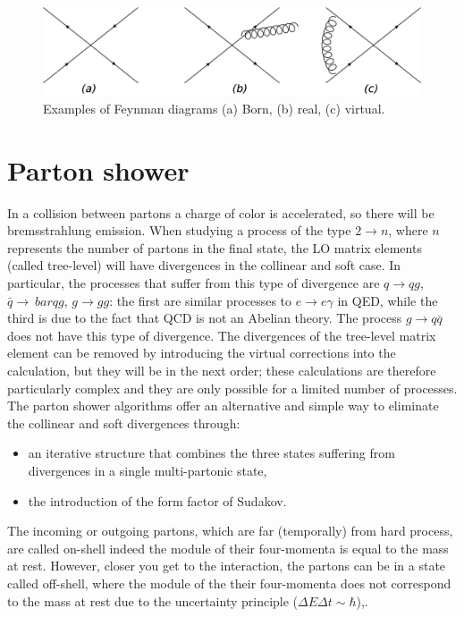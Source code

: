\begin{figure}
\centering
\includegraphics[scale=0.22]{../Cap3/Fig_MC/nlo2}
\caption{ Examples of Feynman diagrams (a)  Born, (b) real, (c) virtual. }
\label{nlofig}
\end{figure}

 
\section{Parton shower}
\label{ps}
In a collision between partons a charge of color is accelerated, so there will be bremsstrahlung emission. When studying a process of the type $ 2 \rightarrow n $, where $ n $ represents the number of partons in the final state, the LO matrix elements (called tree-level) will have divergences in the collinear  and 
soft case. In particular, the processes that suffer from this type of divergence are $ q \rightarrow qg $, $ \bar {q} \rightarrow \ bar{q} g $, $ g \rightarrow gg $: the first are similar processes to $ e \rightarrow e \gamma $ in QED, while the third is due to the fact that QCD is not an Abelian theory. The process $ g \rightarrow q \bar {q} $ does not have this type of divergence.
The divergences of the tree-level matrix element can be removed by introducing the virtual corrections into the calculation, but they will be in the next order; these calculations are therefore particularly complex and they are only possible for a limited number of processes. The parton shower \cite{Sjostrand: 2006su} algorithms offer an alternative and simple way to eliminate the collinear and soft divergences through:
\begin{itemize}
\item an iterative structure that combines the three states suffering from divergences in a single multi-partonic state,
\item the introduction of the form factor of Sudakov.
\end{itemize}
The incoming or outgoing partons, which are far (temporally) from hard process, are called on-shell indeed the module of their four-momenta   is equal to the mass at rest.
However, closer you get to the interaction,  the partons can be in a state called off-shell, where the module of the their four-momenta does not correspond to the mass at rest due to the uncertainty principle ($ \Delta E \Delta t \sim \hbar $),. 
